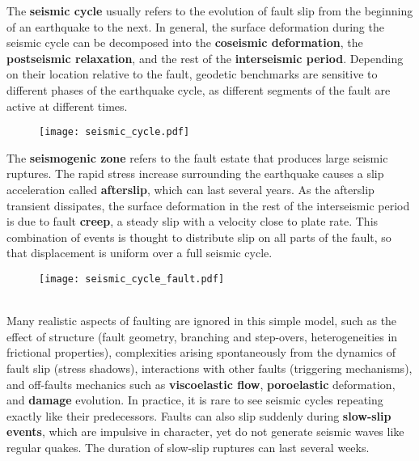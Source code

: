 \documentclass[letterpaper,12pt,]{memoir}
\begin{document}
The \textbf{seismic cycle} usually refers to the evolution of fault slip from the beginning of an earthquake to the next. In general, the surface deformation during the seismic cycle can be decomposed into the \textbf{coseismic deformation}, the \textbf{postseismic relaxation}, and the rest of the \textbf{interseismic period}. Depending on their location relative to the fault, geodetic benchmarks are sensitive to different phases of the earthquake cycle, as different segments of the fault are active at different times. 
%
\begin{figure}[h]
\begin{center}
\texttt{[image: seismic\_cycle.pdf]}
\end{center}
\end{figure}
\vspace{-0.5cm}
%
The \textbf{seismogenic zone} refers to the fault estate that produces large seismic ruptures. The rapid stress increase surrounding the earthquake causes a slip acceleration called \textbf{afterslip}, which can last several years. As the afterslip transient dissipates, the surface deformation in the rest of the interseismic period is due to fault \textbf{creep}, a steady slip with a velocity close to plate rate. This combination of events is thought to distribute slip on all parts of the fault, so that displacement is uniform over a full seismic cycle. \\
%
\begin{figure}[h]
\begin{center}
\texttt{[image: seismic\_cycle\_fault.pdf]}
\end{center}
\end{figure}
\vspace{-0.5cm}
%
\\
Many realistic aspects of faulting are ignored in this simple model, such as the effect of structure (fault geometry, branching and step-overs, heterogeneities in frictional properties), complexities arising spontaneously from the dynamics of fault slip (stress shadows), interactions with other faults (triggering mechanisms), and off-faults mechanics such as \textbf{viscoelastic flow}, \textbf{poroelastic} deformation, and \textbf{damage} evolution. In practice, it is rare to see seismic cycles repeating exactly like their predecessors. Faults can also slip suddenly during \textbf{slow-slip events}, which are impulsive in character, yet do not generate seismic waves like regular quakes. The duration of slow-slip ruptures can last several weeks.
\end{document}
